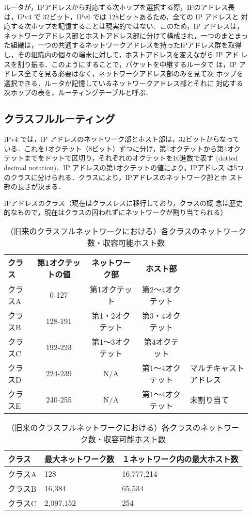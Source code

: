 ルータが，IPアドレスから対応する次ホップを選択する際，IPのアドレス長
は，IPv4 で 32ビット，IPv6 では 128ビットあるため，全ての IP アドレスと
対応する次ホップを記憶することは現実的ではない．このため，IP アドレスは，
ネットワークアドレス部とホストアドレス部に分けて構成され，一つのまとまっ
た組織は，一つの共通するネットワークアドレスを持ったIPアドレス群を取得
し，その組織内の個々の端末に対して，ホストアドレスを変えながら IP アド
レスを割り振る．このようにすることで，パケットを中継するルータで
は，IP アドレス全てを見る必要はなく，ネットワークアドレス部のみを見て次
ホップを選択できる．ルータが記憶しているネットワークアドレス部とそれに
対応する次ホップの表を，ルーティングテーブルと呼ぶ．

\subsection{クラスフルルーティング}
IPv4 では，IP アドレスのネットワーク部とホスト部は，32ビットからなって
いる．これを1オクテット（8ビット）ずつに分け，第1オクテットから第4オク
テットまでをドットで区切り，それぞれのオクテットを10進数で表す (dotted
decimal notation)．IP アドレスの第1オクテットの値により，IPアドレス
は5つのクラスに分けられる．クラスにより，IPアドレスのネットワーク部とホ
スト部の長さが決まる．
\begin{table}[tb]
  \centering
  \caption{IPアドレスのクラス（現在はクラスレスに移行しており，クラスの概
 念は歴史的なもので，現在はクラスの囚われずにネットワークが割り当てられる）}
  \label{tab:16:ipclass}	
  \begin{tabular}{l|c|c|c|l}
    \hline
    クラス & 第1オクテットの値 & ネットワーク部 & ホスト部 & \\
    \hline
    クラスA & 0-127 & 第1オクテット & 第2〜4オクテット & \\
    \hline
    クラスB & 128-191 & 第1・2オクテット & 第3・4オクテット & \\ 
    \hline
    クラスC & 192-223 & 第1〜3オクテット & 第4オクテット & \\
    \hline
    クラスD & 224-239 & N/A & 第1〜4オクテット & マルチキャストアドレス\\
    \hline
    クラスE & 240-255 & N/A & 第1〜4オクテット & 未割り当て\\
    \hline
  \end{tabular}

  \caption{（旧来のクラスフルネットワークにおける）各クラスのネットワーク数・収容可能ホスト数}
   \label{tab:16:numnethost}
  \begin{tabular}{l|l|l}
    \hline
    クラス & 最大ネットワーク数 & １ネットワーク内の最大ホスト数 \\
    \hline
    クラスA & 128 & 16,777,214\\
    \hline
    クラスB & 16,384 & 65,534\\
    \hline
    クラスC & 2,097,152 & 254\\
    \hline
  \end{tabular}
\end{table}


